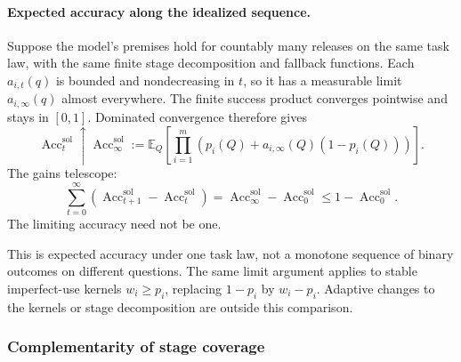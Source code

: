 \documentclass[10pt]{article} %
\providecommand{\1}{\mathbf{1}}  %
\theoremstyle{remark}
\theoremstyle{definition}
\begin{document}
\paragraph{Expected accuracy along the idealized sequence.}

Suppose the model's premises hold for countably many releases on the
same task law, with the same finite stage decomposition and fallback
functions. Each $a_{i,t}(q)$ is bounded and nondecreasing in $t$, so it
has a measurable limit $a_{i,\infty}(q)$ almost everywhere. The finite
success product converges pointwise and stays in $[0,1]$. Dominated
convergence therefore gives
\begin{equation}
\operatorname{Acc}^{\mathrm{sol}}_t
\uparrow\operatorname{Acc}^{\mathrm{sol}}_{\infty}
:=\mathbb E_Q\!\left[
\prod_{i=1}^{m}
\left(p_i(Q)+a_{i,\infty}(Q)(1-p_i(Q))\right)\right].
\label{eq:reuse-accuracy-limit}
\end{equation}
The gains telescope:
\[
\sum_{t=0}^{\infty}
\left(\operatorname{Acc}^{\mathrm{sol}}_{t+1}
-\operatorname{Acc}^{\mathrm{sol}}_t\right)
=\operatorname{Acc}^{\mathrm{sol}}_{\infty}
-\operatorname{Acc}^{\mathrm{sol}}_0
\leq1-\operatorname{Acc}^{\mathrm{sol}}_0.
\]
The limiting accuracy need not be one.

This is expected accuracy under one task law, not a monotone sequence of
binary outcomes on different questions. The same limit argument applies
to stable imperfect-use kernels $w_i\geq p_i$, replacing $1-p_i$ by
$w_i-p_i$. Adaptive changes to the kernels or stage decomposition are
outside this comparison.

\subsubsection{Complementarity of stage coverage}
\label{subsubsec:reuse-complementarity}
\end{document}
